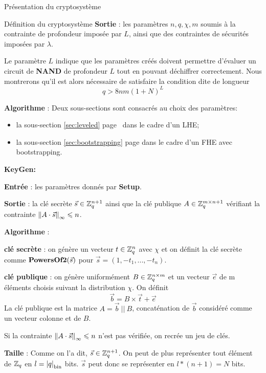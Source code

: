 \begin{section}{Présentation du cryptosystème}
\begin{subsection}{Définition du cryptosystème}
	\textbf{Sortie} : les paramètres $n, q, \chi, m$ soumis à la contrainte de profondeur imposée par $L$, ainsi que
	des contraintes de sécurités imposées par $\lambda$.

	Le paramètre $L$ indique que les paramètres créés doivent permettre d'évaluer un circuit de \textbf{NAND} de profondeur $L$ tout en pouvant déchiffrer correctement. Nous montrerons qu'il est alors nécessaire de satisfaire la condition dite \og de longueur \fg~  
	\begin{equation}\label{eq:longueur} q > 8nm (1 + N)^L \end{equation}

	\textbf{Algorithme} : Deux sous-sections sont consacrés au choix des paramètres:
	\begin{itemize}
	\item la sous-section \ref{sec:leveled} page \pageref{sec:leveled} dans le cadre d'un LHE;
	\item la sous-section \ref{sec:bootstrapping} page \pageref{sec:bootstrapping} dans le cadre d'un FHE avec
	bootstrapping.
	\end{itemize}
	
\begin{samepage}
\vspace{0.5cm}\noindent\textbf{KeyGen:}
\flushleft
	
	\textbf{Entrée} : les paramètres donnés par \textbf{Setup}.

	\textbf{Sortie} : la clé secrète $\vec{s} \in
	\mathbb{Z}_q^{n+1}$ ainsi que la clé publique $A \in \mathbb{Z}_q^{m \times n+1}$ vérifiant la contrainte 
	${\|A \cdot \vec{s}\|}_{\infty} \leqslant n$.
\end{samepage}

	\textbf{Algorithme} :

	\textbf{clé secrète} : on génère un vecteur $t \in \mathbb{Z}_q^n$ avec $\chi$ et on définit la clé secrète comme $\text{\textbf{PowersOf2}}(\vec{s})$ pour $\vec{s} = (1, -t_1, ..., -t_n)$.

	\textbf{clé publique} : on génère uniformément $B \in \mathbb{Z}_q^{n \times m}$ et un vecteur $\vec{e}$ de m éléments
	choisis suivant la distribution $\chi$. On définit 
	\[\vec{b} = B \times \vec{t} + \vec{e}\]  
	La clé publique est la matrice $A = \vec{b}\: || \:B$, concaténation de $\vec{b}$ considéré comme
	un vecteur colonne et de $B$.

	Si la contrainte ${\|A \cdot \vec{s}\|}_{\infty} \leqslant n$ n'est pas vérifiée, on recrée un jeu de clés.

	\textbf{Taille} : Comme on l'a dit, $\vec{s} \in \mathbb{Z}_q^{n+1}$. On peut de plus représenter tout élément de
	$\mathbb{Z}_q$ en $l = {|q|}_{\text{bin}}$ bits.  $\vec{s}$ peut donc se représenter en  $l * (n+1) = N$ bits.


\end{subsection}
\end{section}
